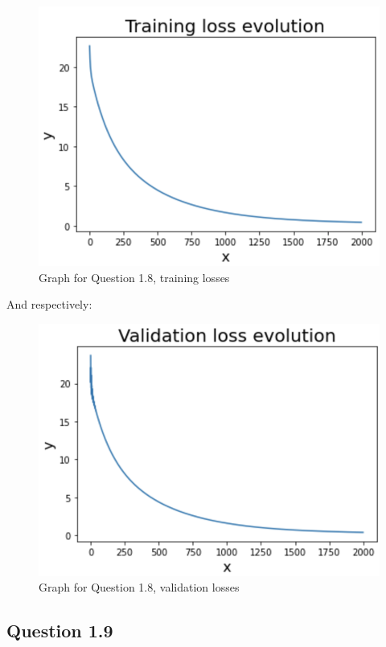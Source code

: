 \documentclass{article}
\begin{document}
\begin{figure}[!htb]
\centering
\includegraphics[scale = 0.8]{Question8_Graph1.png}
\caption{\label{fig:fig}Graph for Question 1.8, training losses}
\end{figure}

And respectively:

\begin{figure}[!htb]
\centering
\includegraphics[scale = 0.8]{Question8_Graph2.png}
\caption{\label{fig:fig}Graph for Question 1.8, validation losses}
\end{figure}


\subsection{Question 1.9}
\end{document}
